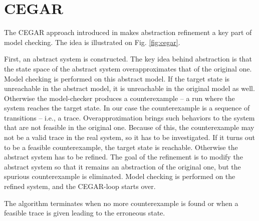 

\section{CEGAR}



The CEGAR approach introduced in \cite{clarke2003counterexample} makes
abstraction refinement a key part of model checking. The idea is illustrated on
Fig. \ref{fig:cegar}.

First, an abstract system is constructed. The key idea behind abstraction is
that the state space of the abstract system overapproximates that of the original
one. 
Model checking is performed on this abstract model. If the target state is
unreachable in the abstract model, it is unreachable in the original model
as well. Otherwise the model-checker produces a counterexample -- a run where the
system reaches the target state. In our case the counterexample is a sequence of
transitions -- i.e., a trace. Overapproximation brings such behaviors to the system that are not feasible in the original one. Because of this, the counterexample may not be a valid trace in the real system, so it has to be investigated.
If it turns
out to be a feasible counterexample, the target state is reachable. Otherwise
the abstract system has to be refined. The goal of the refinement is to modify the abstract
system so that it remains an abstraction of the original one, but the spurious
counterexample is eliminated.  Model checking is performed on the
refined system, and the CEGAR-loop starts over. 

The algorithm terminates when no more
counterexample is found or when a feasible trace is
given leading to the erroneous state.